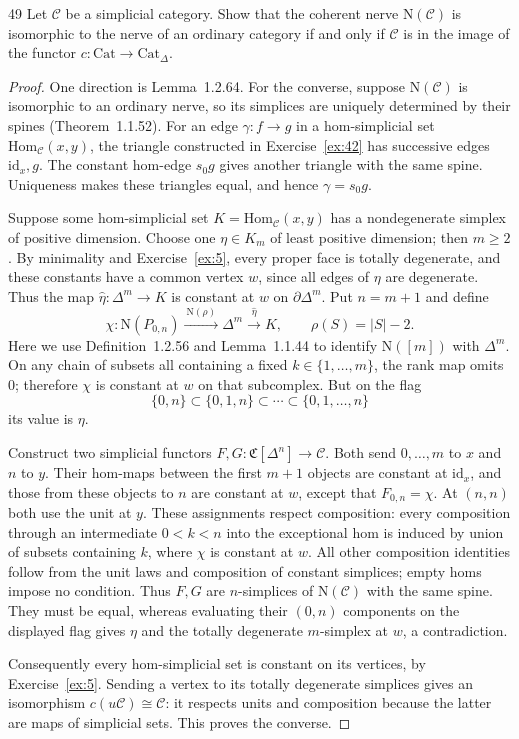 \begin{exercise}{49}
Let $\mathcal C$ be a simplicial category. Show that the coherent nerve $\mathrm{N}(\mathcal C)$ is isomorphic
to the nerve of an ordinary category if and only if $\mathcal C$ is in the image of the functor $c\colon\mathrm{Cat}\to
\mathrm{Cat}_{\Delta}$.

\begin{proof}
One direction is Lemma~1.2.64. For the converse, suppose
$\mathrm{N}(\mathcal C)$ is isomorphic to an ordinary nerve, so its simplices
are uniquely determined by their spines (Theorem~1.1.52).
For an edge $\gamma\colon f\to g$ in a hom-simplicial set
$\mathrm{Hom}_{\mathcal C}(x,y)$, the triangle constructed in
Exercise~\ref{ex:42} has successive edges $\mathrm{id}_x,g$.
The constant hom-edge $s_0g$ gives another triangle with
the same spine. Uniqueness makes these triangles equal,
and hence $\gamma=s_0g$.

Suppose some hom-simplicial set $K=\mathrm{Hom}_{\mathcal C}(x,y)$
has a nondegenerate simplex of positive dimension.
Choose one $\eta\in K_m$ of least positive dimension;
then $m\ge2$.
By minimality and Exercise~\ref{ex:5}, every proper face is
totally degenerate, and these constants have a common vertex
$w$, since all edges of $\eta$ are degenerate.
Thus the map $\widehat\eta\colon\Delta^m\to K$ is constant
at $w$ on $\partial\Delta^m$.
Put $n=m+1$ and define
\[
 \chi\colon\mathrm{N}(P_{0,n})
 \xrightarrow{\ \mathrm{N}(\rho)\ }\Delta^m
 \xrightarrow{\ \widehat\eta\ }K,
 \qquad \rho(S)=|S|-2.
\]
Here we use Definition~1.2.56 and Lemma~1.1.44 to identify
$\mathrm{N}([m])$ with $\Delta^m$.
On any chain of subsets all containing a fixed
$k\in\{1,\ldots,m\}$, the rank map omits $0$;
therefore $\chi$ is constant at $w$ on that subcomplex.
But on the flag
\[
 \{0,n\}\subset\{0,1,n\}\subset\cdots\subset\{0,1,\ldots,n\}
\]
its value is $\eta$.

Construct two simplicial functors
$F,G\colon\mathfrak C[\Delta^n]\to\mathcal C$.
Both send $0,\ldots,m$ to $x$ and $n$ to $y$.
Their hom-maps between the first $m+1$ objects are constant
at $\mathrm{id}_x$, and those from these objects to $n$
are constant at $w$, except that $F_{0,n}=\chi$.
At $(n,n)$ both use the unit at $y$.
These assignments respect composition: every composition
through an intermediate $0<k<n$ into the exceptional hom
is induced by union of subsets containing $k$, where
$\chi$ is constant at $w$.
All other composition identities follow from the unit laws
and composition of constant simplices; empty homs impose no condition.
Thus $F,G$ are $n$-simplices of $\mathrm{N}(\mathcal C)$
with the same spine. They must be equal, whereas evaluating
their $(0,n)$ components on the displayed flag gives
$\eta$ and the totally degenerate $m$-simplex at $w$,
a contradiction.

Consequently every hom-simplicial set is constant on its
vertices, by Exercise~\ref{ex:5}.
Sending a vertex to its totally degenerate simplices gives
an isomorphism $c(u\mathcal C)\cong\mathcal C$:
it respects units and composition because the latter are
maps of simplicial sets. This proves the converse.
\end{proof}
\end{exercise}
